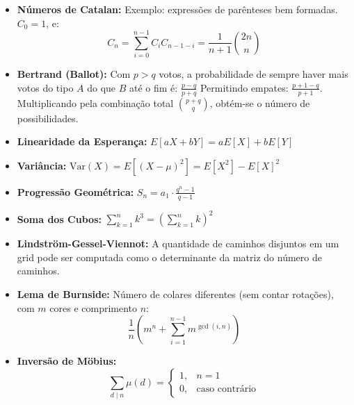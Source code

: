 \begin{small}
\begin{itemize}
    \item \textbf{Números de Catalan:} Exemplo: expressões de parênteses bem formadas. $C_0 = 1$, e:
    \[
    C_n = \sum_{i=0}^{n-1} C_i C_{n-1-i} = \frac{1}{n+1} \binom{2n}{n}
    \]


    \item \textbf{Bertrand (Ballot):} Com $p > q$ votos, a probabilidade de sempre haver mais votos do tipo $A$ do que $B$ até o fim é:
    $ \frac{p - q}{p + q} $
    Permitindo empates: 
    $\frac{p + 1 - q}{p + 1}$. Multiplicando pela combinação total $\binom{p + q}{q}$, obtém-se o número de possibilidades.

    
    \item \textbf{Linearidade da Esperança:} $E[aX + bY] = aE[X] + bE[Y]$

    \item \textbf{Variância:} $\text{Var}(X) = E[(X - \mu)^2] = E[X^2] - E[X]^2$

    \item \textbf{Progressão Geométrica:} $S_n = a_1 \cdot \frac{q^n - 1}{q - 1}$

    \item \textbf{Soma dos Cubos:} $\sum_{k=1}^{n} k^3 = \left( \sum_{k=1}^{n} k \right)^2$

    \item \textbf{Lindström-Gessel-Viennot:} A quantidade de caminhos disjuntos em um grid pode ser computada como o determinante da matriz do número de caminhos.
    
    \item \textbf{Lema de Burnside:} Número de colares diferentes (sem contar rotações), com $m$ cores e comprimento $n$:
    \[
    \frac{1}{n} \left(m^n + \sum_{i=1}^{n-1} m^{\gcd(i, n)} \right)
    \]

    \item \textbf{Inversão de Möbius:}
    \[
    \sum_{d \mid n} \mu(d) = \begin{cases}
    1, & n = 1 \\
    0, & \text{caso contrário}
    \end{cases}
    \]


\end{itemize}
\end{small}

